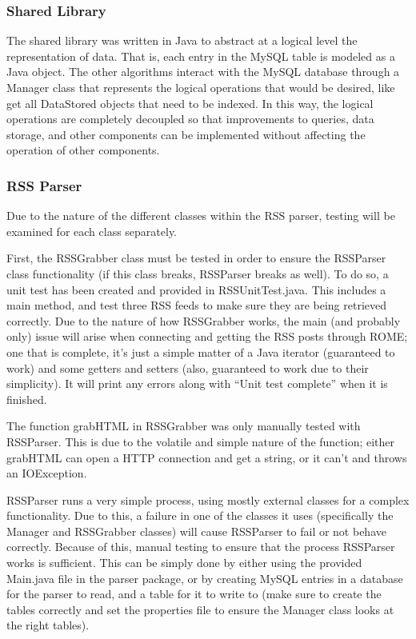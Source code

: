 \documentclass[11pt]{article} %
\begin{document}
\subsubsection{Shared Library}

The shared library was written in Java to abstract at a logical level the representation of data. That is, each entry in the MySQL table is modeled as a Java object. The other algorithms interact with the MySQL database through a Manager class that represents the logical operations that would be desired, like get all DataStored objects that need to be indexed. In this way, the logical operations are completely decoupled so that improvements to queries, data storage, and other components can be implemented without affecting the operation of other components.

\subsubsection{RSS Parser}

Due to the nature of the different classes within the RSS parser, testing will be examined for each class separately.

First, the RSSGrabber class must be tested in order to ensure the RSSParser class functionality (if this class breaks, RSSParser breaks as well). To do so, a unit test has been created and provided in RSSUnitTest.java. This includes a main method, and test three RSS feeds to make sure they are being retrieved correctly. Due to the nature of how RSSGrabber works, the main (and probably only) issue will arise when connecting and getting the RSS posts through ROME; one that is complete, it’s just a simple matter of a Java iterator (guaranteed to work) and some getters and setters (also, guaranteed to work due to their simplicity). It will print any errors along with “Unit test complete” when it is finished.

The function grabHTML in RSSGrabber was only manually tested with RSSParser. This is due to the volatile and simple nature of the function; either grabHTML can open a HTTP connection and get a string, or it can’t and throws an IOException.

RSSParser runs a very simple process, using mostly external classes for a complex functionality. Due to this, a failure in one of the classes it uses (specifically the Manager and RSSGrabber classes) will cause RSSParser to fail or not behave correctly. Because of this, manual testing to ensure that the process RSSParser works is sufficient. This can be simply done by either using the provided Main.java file in the parser package, or by creating MySQL entries in a database for the parser to read, and a table for it to write to (make sure to create the tables correctly and set the properties file to ensure the Manager class looks at the right tables).
\end{document}
